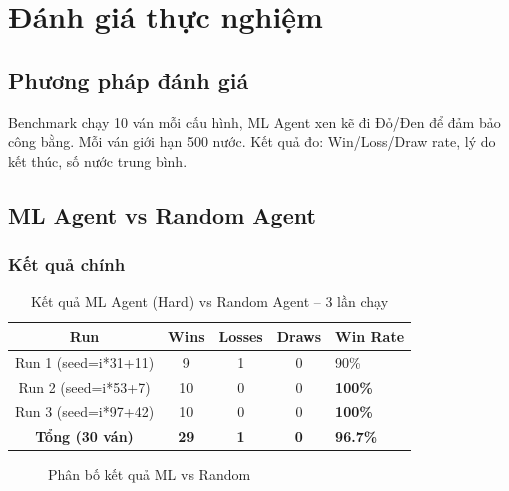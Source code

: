 \section{Đánh giá thực nghiệm}

\subsection{Phương pháp đánh giá}
Benchmark chạy 10 ván mỗi cấu hình, ML Agent xen kẽ đi Đỏ/Đen để đảm bảo công bằng. Mỗi ván giới hạn 500 nước. Kết quả đo: Win/Loss/Draw rate, lý do kết thúc, số nước trung bình.

\subsection{ML Agent vs Random Agent}

\subsubsection{Kết quả chính}
\begin{table}[H]
\centering
\caption{Kết quả ML Agent (Hard) vs Random Agent -- 3 lần chạy}
\begin{tabular}{ccccl}
\toprule
\textbf{Run} & \textbf{Wins} & \textbf{Losses} & \textbf{Draws} & \textbf{Win Rate} \\
\midrule
Run 1 (seed=i*31+11) & 9 & 1 & 0 & 90\% \\
Run 2 (seed=i*53+7) & 10 & 0 & 0 & \textbf{100\%} \\
Run 3 (seed=i*97+42) & 10 & 0 & 0 & \textbf{100\%} \\
\midrule
\textbf{Tổng (30 ván)} & \textbf{29} & \textbf{1} & \textbf{0} & \textbf{96.7\%} \\
\bottomrule
\end{tabular}
\end{table}

\begin{figure}[H]
\centering
{}
\caption{Phân bố kết quả ML vs Random}
\end{figure}

